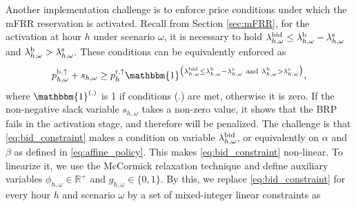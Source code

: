 \documentclass[11pt,a4paper]{article}
\begin{document}
Another implementation challenge is to enforce price conditions under which the mFRR reservation is activated.
Recall from Section \ref{sec:mFRR}, for the activation at hour $h$ under scenario $\omega$, it is necessary to hold $\lambda_{h,\omega}^{\rm{bid}} \leq  \lambda_{h,\omega}^{\rm{b}} - \lambda_{h,\omega}^{\rm{s}}$ and $ \lambda_{h,\omega}^{\rm{b}} > \lambda_{h,\omega}^{\rm{s}}$. These conditions can be equivalently enforced as
%
%
\begin{equation}\label{eq:bid_constraint}
    p^{\rm{b}, \uparrow}_{h,\omega} + s_{h,\omega} \geq p^{\rm{r},\uparrow}_{h}  \mathbbm{1}^{\big(\lambda_{h,\omega}^{\rm{bid}} \leq  \lambda_{h,\omega}^{\rm{b}} - \lambda_{h,\omega}^{\rm{s}} \ \text{and} \ \lambda^{\rm{b}}_{h,\omega} > \lambda^{\rm{s}}_{h,\omega}\big)},
\end{equation}
where $\mathbbm{1}^{(.)}$ is 1 if conditions (.) are met, otherwise it is zero. If the non-negative slack variable $s_{h,\omega}$ takes a non-zero value, it shows that the BRP fails in the activation stage, and therefore will be penalized. The challenge is that \eqref{eq:bid_constraint} makes a condition on variable $\lambda_{h,\omega}^{\rm{bid}}$, or equivalently on $\alpha$ and $\beta$ as defined in \eqref{eq:affine_policy}. This makes \eqref{eq:bid_constraint} non-linear. To linearize it, we use the McCormick relaxation technique \cite{mccormick1976computability} and define auxiliary  variables $\phi_{h,\omega} \in \mathbb{R}^{+}$ and $g_{h,\omega} \in \{0, 1\}$. By this, we replace \eqref{eq:bid_constraint} for every hour $h$ and scenario $\omega$ by a set of mixed-integer linear constraints as
%
%
\end{document}

